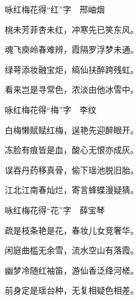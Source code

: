 \begin{poem}

    \begin{pl}

        咏红梅花得“红”字　邢岫烟
    \end{pl}
    \begin{pl}

        桃未芳菲杏未红，冲寒先已笑东风。
    \end{pl}
    \begin{pl}

        魂飞庾岭春难辨，霞隔罗浮梦未通。
    \end{pl}
    \begin{pl}

        绿萼添妆融宝炬，缟仙扶醉跨残虹。
    \end{pl}
    \begin{pl}

        看来岂是寻常色，浓淡由他冰雪中。
    \end{pl}

    \emptypl

    \begin{pl}
        咏红梅花得“梅”字　李纹
    \end{pl}
    \begin{pl}

        白梅懒赋赋红梅，逞艳先迎醉眼开。
    \end{pl}
    \begin{pl}

        冻脸有痕皆是血，酸心无恨亦成灰。
    \end{pl}
    \begin{pl}

        误吞丹药移真骨，偷下瑶池脱旧胎。
    \end{pl}
    \begin{pl}

        江北江南春灿烂，寄言蜂蝶漫疑猜。
    \end{pl}

    \emptypl
    \begin{pl}
        咏红梅花得“花”字　薛宝琴
    \end{pl}
    \begin{pl}

        疏是枝条艳是花，春妆儿女竞奢华。
    \end{pl}
    \begin{pl}

        闲庭曲槛无余雪，流水空山有落霞。
    \end{pl}
    \begin{pl}

        幽梦冷随红袖笛，游仙香泛绛河槎。
    \end{pl}
    \begin{pl}

        前身定是瑶台种，无复相疑色相差。
    \end{pl}
\end{poem}

